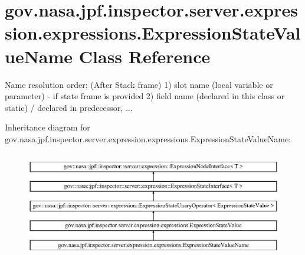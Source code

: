 \hypertarget{classgov_1_1nasa_1_1jpf_1_1inspector_1_1server_1_1expression_1_1expressions_1_1_expression_state_value_name}{}\section{gov.\+nasa.\+jpf.\+inspector.\+server.\+expression.\+expressions.\+Expression\+State\+Value\+Name Class Reference}
\label{classgov_1_1nasa_1_1jpf_1_1inspector_1_1server_1_1expression_1_1expressions_1_1_expression_state_value_name}


Name resolution order\+: (After Stack frame) 1) slot name (local variable or parameter) -\/ if state frame is provided 2) field name (declared in this class or static) / declared in predecessor, ...  


Inheritance diagram for gov.\+nasa.\+jpf.\+inspector.\+server.\+expression.\+expressions.\+Expression\+State\+Value\+Name\+:\begin{figure}[H]
\begin{center}
\leavevmode
\includegraphics[height=4.745763cm]{classgov_1_1nasa_1_1jpf_1_1inspector_1_1server_1_1expression_1_1expressions_1_1_expression_state_value_name}
\end{center}
\end{figure}
